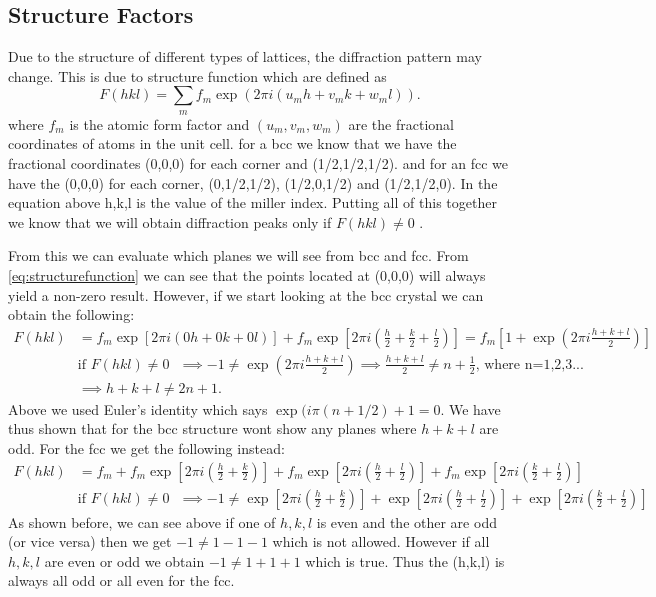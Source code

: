 \subsection{Structure Factors}
Due to the structure of different types of lattices, the diffraction pattern may change. This is due to structure function which are defined as 
\begin{equation}
    F(hkl) = \sum_{m} f_m \exp\left( 2\pi i (u_m h + v_m k + w_m l) \right). 
    \label{eq:structurefunction}
\end{equation}
where $f_m$ is the atomic form factor and $(u_m,v_m,w_m)$ are the fractional coordinates of atoms in the unit cell. for a bcc we know that we have the fractional coordinates (0,0,0) for each corner and (1/2,1/2,1/2). and for an fcc we have the (0,0,0) for each corner,  (0,1/2,1/2), (1/2,0,1/2) and (1/2,1/2,0). In the equation above h,k,l is the value of the miller index. Putting all of this together we know that we will obtain diffraction peaks only if $F(hkl)\neq0$ \cite{solidstatephysics2025}. 

From this we can evaluate which planes we will see from bcc and fcc. From \autoref{eq:structurefunction} we can see that the points located at (0,0,0) will always yield a non-zero result. However, if we start looking at the bcc crystal we can obtain the following:
\begin{align}
    F(hkl) &= f_m \exp\left[ 2\pi i \left(0{h}+0{k}+0{l}\right) \right]+ f_m \exp\left[ 2\pi i \left(\frac{h}{2} + \frac{k}{2} + \frac{l}{2}\right) \right]=f_m\left[1+ \exp\left( 2\pi i \frac{h+k+l}{2} \right)\right] \\
    &\text{if $F(hkl)\neq0$ } \implies -1\neq \exp\left( 2\pi i \frac{h+k+l}{2} \right) \implies \frac{h+k+l}{2} \neq n+\frac{1}{2} \text{, where n=1,2,3...} \\
    &\implies h+k+l\neq 2n+1.
\end{align}
Above we used Euler's identity which says $\exp(i\pi (n+1/2)+1=0$. We have thus shown that for the bcc structure wont show any planes where $h+k+l$ are odd. For the fcc we get the following instead:
\begin{align}
    F(hkl) &= f_m + f_m \exp\left[ 2\pi i \left(\frac{h}{2} + \frac{k}{2}\right) \right]+f_m \exp\left[ 2\pi i \left(\frac{h}{2} + \frac{l}{2}\right) \right]+f_m \exp\left[ 2\pi i \left(\frac{k}{2} + \frac{l}{2}\right) \right]\\
    &\text{if $F(hkl)\neq0$ } \implies -1\neq \exp\left[ 2\pi i \left(\frac{h}{2} + \frac{k}{2}\right) \right]+ \exp\left[ 2\pi i \left(\frac{h}{2} + \frac{l}{2}\right) \right]+ \exp\left[ 2\pi i \left(\frac{k}{2} + \frac{l}{2}\right) \right]
\end{align}
As shown before, we can see above if one of $h,k,l$ is even and the other are odd (or vice versa) then we get $-1\neq1-1-1$ which is not allowed. However if all $h,k,l$ are even or odd we obtain $-1\neq1+1+1$ which is true. Thus the (h,k,l) is always all odd or all even for the fcc. 

